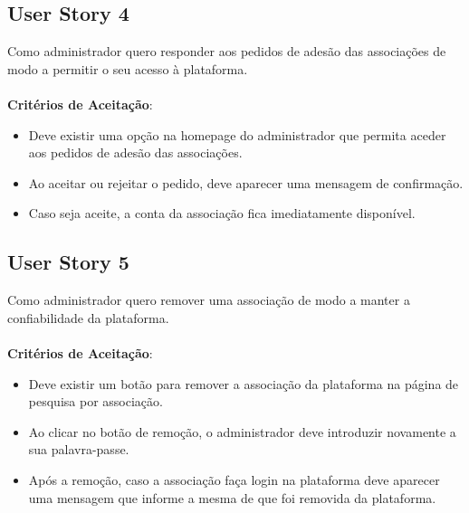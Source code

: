 \documentclass[a4paper,11pt]{article}
\begin{document}
\subsection{User Story 4}
Como administrador quero responder aos pedidos de adesão das associações de modo a permitir o seu acesso à plataforma.\\\\
\textbf{Critérios de Aceitação}:
\begin{itemize}
  \item Deve existir uma opção na homepage do administrador que permita aceder aos pedidos de adesão das associações.
  \item Ao aceitar ou rejeitar o pedido, deve aparecer uma mensagem de confirmação.
  \item Caso seja aceite, a conta da associação fica imediatamente disponível.
\end{itemize}

\subsection{User Story 5}
Como administrador quero remover uma associação de modo a manter a confiabilidade da plataforma.\\\\
\textbf{Critérios de Aceitação}:
\begin{itemize}
  \item Deve existir um botão para remover a associação da plataforma na página de pesquisa por associação.
  \item Ao clicar no botão de remoção, o administrador deve introduzir novamente a sua palavra-passe.
  \item Após a remoção, caso a associação faça login na plataforma deve aparecer uma mensagem que informe a mesma de que foi removida da plataforma.
\end{itemize}
\end{document}
